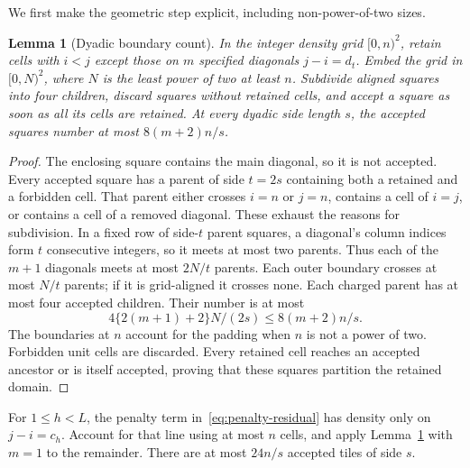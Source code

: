 \documentclass[11pt]{article}
\newtheorem{lemma}[theorem]{Lemma}
\begin{document}
We first make the geometric step explicit, including non-power-of-two sizes.
\begin{lemma}[Dyadic boundary count]\label{lem:dyadic-boundary}
In the integer density grid $[0,n)^2$, retain cells with $i<j$ except
those on $m$ specified diagonals $j-i=d_t$. Embed the grid in
$[0,N)^2$, where $N$ is the least power of two at least $n$. Subdivide
aligned squares into four children, discard squares without retained
cells, and accept a square as soon as all its cells are retained.
At every dyadic side length $s$, the accepted squares number at most
$8(m+2)n/s$.
\end{lemma}
\begin{proof}
The enclosing square contains the main diagonal, so it is not accepted.
Every accepted square has a parent of side $t=2s$ containing both a
retained and a forbidden cell. That parent either crosses $i=n$ or $j=n$,
contains a cell of $i=j$, or contains a cell of a removed diagonal.
These exhaust the reasons for subdivision. In a fixed row of side-$t$
parent squares, a diagonal's column indices form $t$ consecutive integers,
so it meets at most two parents. Thus each of the $m+1$ diagonals meets
at most $2N/t$ parents. Each outer boundary crosses at most $N/t$ parents;
if it is grid-aligned it crosses none. Each charged parent has at most
four accepted children. Their number is at most
\[
 4\{2(m+1)+2\}N/(2s)\le8(m+2)n/s.
\]
The boundaries at $n$ account for the padding when $n$ is not a power
of two. Forbidden unit cells are discarded. Every retained cell reaches
an accepted ancestor or is itself accepted, proving that these squares
partition the retained domain.
\end{proof}

For $1\le h<L$, the penalty term in~\eqref{eq:penalty-residual} has
density only on $j-i=c_h$. Account for that line using at most $n$ cells,
and apply Lemma~\ref{lem:dyadic-boundary} with $m=1$ to the remainder.
There are at most $24n/s$ accepted tiles of side $s$.
\end{document}
